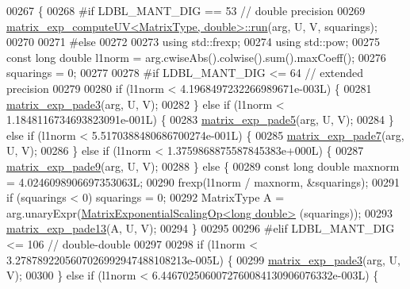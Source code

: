 \begin{DoxyCode}
00267   \{
00268 \textcolor{preprocessor}{#if   LDBL\_MANT\_DIG == 53   // double precision}
00269     \hyperlink{struct_eigen_1_1internal_1_1matrix__exp__compute_u_v_a7847531ae0fccc8ec7648f95846c8adb}{matrix\_exp\_computeUV<MatrixType, double>::run}(arg, U, V, 
      squarings);
00270   
00271 \textcolor{preprocessor}{#else}
00272   
00273     \textcolor{keyword}{using} std::frexp;
00274     \textcolor{keyword}{using} std::pow;
00275     \textcolor{keyword}{const} \textcolor{keywordtype}{long} \textcolor{keywordtype}{double} l1norm = arg.cwiseAbs().colwise().sum().maxCoeff();
00276     squarings = 0;
00277   
00278 \textcolor{preprocessor}{#if LDBL\_MANT\_DIG <= 64   // extended precision}
00279   
00280     \textcolor{keywordflow}{if} (l1norm < 4.1968497232266989671e-003L) \{
00281       \hyperlink{namespace_eigen_1_1internal_a7e6cf2e01b6fb376d33b9bb8183e5777}{matrix\_exp\_pade3}(arg, U, V);
00282     \} \textcolor{keywordflow}{else} \textcolor{keywordflow}{if} (l1norm < 1.1848116734693823091e-001L) \{
00283       \hyperlink{namespace_eigen_1_1internal_af4992d182490219270a24aaa8285e63a}{matrix\_exp\_pade5}(arg, U, V);
00284     \} \textcolor{keywordflow}{else} \textcolor{keywordflow}{if} (l1norm < 5.5170388480686700274e-001L) \{
00285       \hyperlink{namespace_eigen_1_1internal_a1abecb439e6cb1b5188828cdb7e0ab60}{matrix\_exp\_pade7}(arg, U, V);
00286     \} \textcolor{keywordflow}{else} \textcolor{keywordflow}{if} (l1norm < 1.3759868875587845383e+000L) \{
00287       \hyperlink{namespace_eigen_1_1internal_a218447e97bf869bf354f92e020a7355a}{matrix\_exp\_pade9}(arg, U, V);
00288     \} \textcolor{keywordflow}{else} \{
00289       \textcolor{keyword}{const} \textcolor{keywordtype}{long} \textcolor{keywordtype}{double} maxnorm = 4.0246098906697353063L;
00290       frexp(l1norm / maxnorm, &squarings);
00291       \textcolor{keywordflow}{if} (squarings < 0) squarings = 0;
00292       MatrixType A = arg.unaryExpr(\hyperlink{struct_eigen_1_1internal_1_1_matrix_exponential_scaling_op}{MatrixExponentialScalingOp<long double>}
      (squarings));
00293       \hyperlink{namespace_eigen_1_1internal_ae7d0962a143c96343984440db683905a}{matrix\_exp\_pade13}(A, U, V);
00294     \}
00295   
00296 \textcolor{preprocessor}{#elif LDBL\_MANT\_DIG <= 106  // double-double}
00297   
00298     \textcolor{keywordflow}{if} (l1norm < 3.2787892205607026992947488108213e-005L) \{
00299       \hyperlink{namespace_eigen_1_1internal_a7e6cf2e01b6fb376d33b9bb8183e5777}{matrix\_exp\_pade3}(arg, U, V);
00300     \} \textcolor{keywordflow}{else} \textcolor{keywordflow}{if} (l1norm < 6.4467025060072760084130906076332e-003L) \{

\end{DoxyCode}
